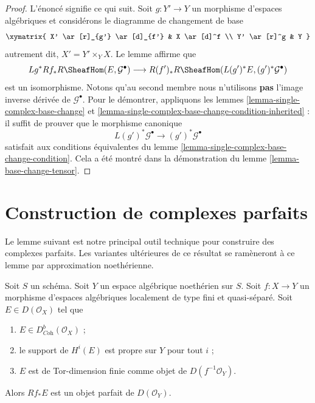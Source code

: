 \begin{proof}
L'énoncé signifie ce qui suit. Soit $g : Y' \to Y$ un morphisme d'espaces
algébriques et considérons le diagramme de changement de base
$$
\xymatrix{
X' \ar[r]_{g'} \ar[d]_{f'} &
X \ar[d]^f \\
Y' \ar[r]^g &
Y
}
$$
autrement dit, $X' = Y' \times_Y X$. Le lemme affirme que
$$
Lg^*Rf_*R\SheafHom(E, \mathcal{G}^\bullet)
\longrightarrow
R(f')_*R\SheafHom(L(g')^*E, (g')^*\mathcal{G}^\bullet)
$$
est un isomorphisme. Notons qu'au second membre nous n'utilisons {\bf pas}
l'image inverse dérivée de $\mathcal{G}^\bullet$. Pour le démontrer, appliquons les
lemmes \ref{lemma-single-complex-base-change} et
\ref{lemma-single-complex-base-change-condition-inherited} : il
suffit de prouver que le morphisme canonique
$$
L(g')^*\mathcal{G}^\bullet \to (g')^*\mathcal{G}^\bullet
$$
satisfait aux conditions équivalentes du
lemme \ref{lemma-single-complex-base-change-condition}.
Cela a été montré dans la démonstration du lemme \ref{lemma-base-change-tensor}.
\end{proof}

\section{Construction de complexes parfaits}
\label{section-producing-perfect}

\noindent
Le lemme suivant est notre principal outil technique pour construire des
complexes parfaits. Les variantes ult\'erieures de ce r\'esultat se ram\`eneront
\`a ce lemme par approximation noeth\'erienne.

\begin{lemma}
\label{lemma-perfect-direct-image}
Soit $S$ un sch\'ema. Soit $Y$ un espace alg\'ebrique noeth\'erien sur $S$.
Soit $f:X\to Y$ un morphisme d'espaces alg\'ebriques localement de type fini
et quasi-s\'epar\'e. Soit $E\in D(\mathcal{O}_X)$ tel que
\begin{enumerate}
\item $E\in D^b_{\textit{Coh}}(\mathcal{O}_X)$ ;
\item le support de $H^i(E)$ est propre sur $Y$ pour tout $i$ ;
\item $E$ est de Tor-dimension finie comme objet de
$D(f^{-1}\mathcal{O}_Y)$.
\end{enumerate}
Alors $Rf_*E$ est un objet parfait de $D(\mathcal{O}_Y)$.
\end{lemma}

